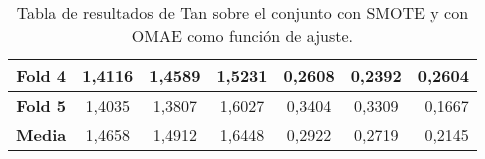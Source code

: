 \begin{table}[H]
{\begin{tabular}{|crrrrrr|}
\multicolumn{1}{|c|}{\textbf{Fold 4}} & \multicolumn{1}{c|}{1,4116}            & \multicolumn{1}{c|}{1,4589}              & \multicolumn{1}{c|}{\textbf{1,5231}} & \multicolumn{1}{c|}{0,2608}            & \multicolumn{1}{c|}{0,2392}              & 0,2604                             \\ \hline
\multicolumn{1}{|c|}{\textbf{Fold 5}} & \multicolumn{1}{c|}{1,4035}            & \multicolumn{1}{c|}{1,3807}              & \multicolumn{1}{c|}{1,6027}          & \multicolumn{1}{c|}{0,3404}            & \multicolumn{1}{c|}{0,3309}              & 0,1667                             \\ \hline
\multicolumn{1}{|c|}{\textbf{Media}}  & \multicolumn{1}{c|}{1,4658}           & \multicolumn{1}{c|}{1,4912}             & \multicolumn{1}{c|}{1,6448}         & \multicolumn{1}{c|}{0,2922}           & \multicolumn{1}{c|}{0,2719}             & 0,2145                            \\ \hline
\end{tabular}%
}
\caption{Tabla de resultados de Tan sobre el conjunto con SMOTE y con OMAE como función de ajuste.}\label{tablaTANconSMOTEconOMAE}

\end{table}


